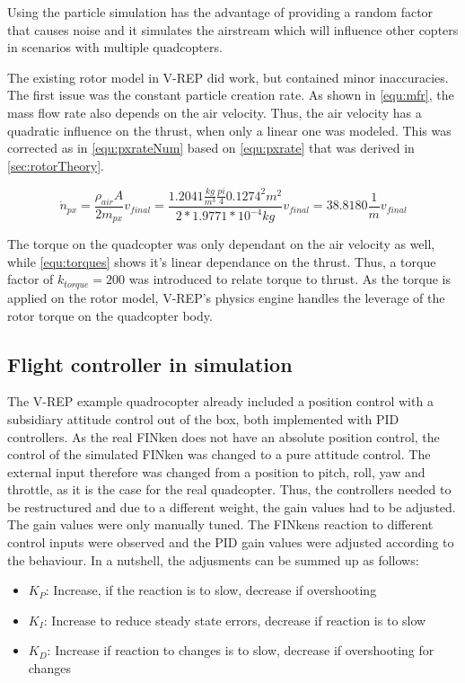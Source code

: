Using the particle simulation has the advantage of providing a  random factor that causes noise and it simulates the airstream which will influence other copters in scenarios with multiple quadcopters.

The existing rotor model in V-REP did work, but contained minor inaccuracies. The first issue was the constant particle creation rate. As shown in \ref{equ:mfr}, the mass flow rate also depends on the air velocity. Thus, the air velocity has a quadratic influence on the thrust, when only a linear one was modeled. This was corrected as in \ref{equ:pxrateNum} based on  \ref{equ:pxrate} that was derived in \ref{sec:rotorTheory}.

  \begin{equation}
    \dot n_{px} = \frac{\rho_{air} A}{2m_{px}} v_{final} = \frac{1.2041 \frac{kg}{m^3} \frac{pi}{4} 0.1274^2 m^2}{2 * 1.9771 * 10^{-4} kg} v_{final} = 38.8180 \frac{1}{m}v_{final}
    \label{equ:pxrateNum}
    \end{equation}
    
   The torque on the quadcopter was only dependant on the air velocity as well, while \ref{equ:torques} shows it's linear dependance on the thrust. Thus, a torque factor of $k_{torque} = 200$ was introduced to relate torque to thrust. 
   As the torque is applied on the rotor model, V-REP's physics engine handles the leverage of the rotor torque on the quadcopter body.





\subsection{Flight controller in simulation}

The V-REP example quadrocopter already included a position control with a subsidiary attitude control out of the box, both implemented with PID controllers.
As the real FINken does not have an absolute position control, the control of the simulated FINken was changed to a pure attitude control.
The external input therefore was changed from a position to pitch, roll, yaw and throttle, as it is the case for the real quadcopter.
Thus, the controllers needed to be restructured and due to a different weight, the gain values had to be adjusted.
The gain values were only manually tuned. 
The FINkens reaction to different control inputs were observed and the PID gain values were adjusted according to the behaviour.
In a nutshell, the adjusments can be summed up as follows:
\begin{itemize}
	\item{$K_P$: Increase, if the reaction is to slow, decrease if overshooting}
	\item{$K_I$: Increase to reduce steady state errors, decrease if reaction is to slow}
	\item{$K_D$: Increase if reaction to changes is to slow, decrease if overshooting for changes}
\end{itemize}

